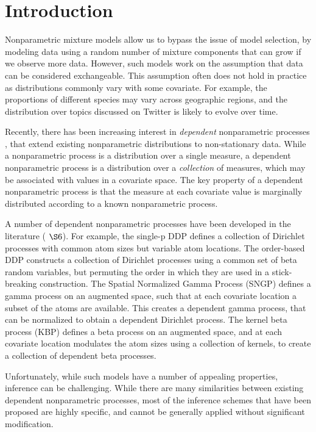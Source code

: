 \section{Introduction} 

Nonparametric mixture models allow us to bypass the
issue of model selection, by modeling data using a random number of mixture components
that can grow if we observe more data. However, such models work on the
assumption that data can be considered exchangeable. This assumption often does
not hold in practice as distributions commonly vary with some covariate. For
example, the proportions of different species may vary across geographic
regions, and the distribution over topics discussed on Twitter is likely to 
evolve over time.

Recently, there has been increasing interest in \emph{dependent} nonparametric
processes \cite{MacEachern:1999}, that extend existing nonparametric
distributions to non-stationary data. While a nonparametric process is a
distribution over a single measure, a dependent nonparametric process is a
distribution over a \emph{collection} of measures, which may be associated with
values in a covariate space. The key property of a dependent nonparametric
process is that the measure at each covariate value is marginally distributed
according to a known nonparametric process.

A number of dependent nonparametric processes have been developed in the
literature (\cite{Dunson:2010} $\S6$). For example, the single-p DDP \cite{MacEachern:1999} defines a
collection of Dirichlet processes with common atom sizes but variable atom
locations. The order-based DDP \cite{Griffin:Steel:2006} constructs a collection of
Dirichlet processes using a common set of beta random variables, but permuting
the order in which they are used in a stick-breaking construction. The Spatial
Normalized Gamma Process (SNGP) \cite{Rao:Teh:2009} defines a gamma process on
an augmented space, such that at each covariate location a subset of the atoms
are available. This creates a dependent gamma process, that can be normalized
to obtain a dependent Dirichlet process. The kernel beta process (KBP)
\cite{Ren:Wang:Dunson:Carin:2011}
defines a beta process on an augmented space, and at each covariate location
modulates the atom sizes using a collection of kernels, to create a collection 
of dependent beta processes.

Unfortunately, while such models have a number of appealing properties,
inference can be challenging. While there are many similarities between
existing dependent nonparametric processes, most of the inference schemes that
have been proposed are highly specific, and cannot be generally applied without
significant modification. 

